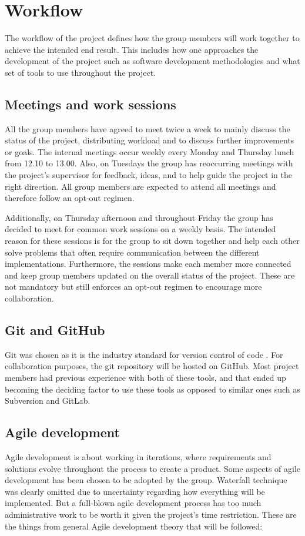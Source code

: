 \section{Workflow}

The workflow of the project defines how the group members will work together to achieve the intended end result.
This includes how one approaches the development of the project such as software development methodologies and what set of tools to use throughout the project.

\subsection{Meetings and work sessions} 
All the group members have agreed to meet twice a week to mainly discuss the status of the project, distributing workload and to discuss further improvements or goals.
The internal meetings occur weekly every Monday and Thursday lunch from 12.10 to 13.00.
Also, on Tuesdays the group has reoccurring meetings with the project's supervisor for feedback, ideas, and to help guide the project in the right direction.
All group members are expected to attend all meetings and therefore follow an opt-out regimen.

Additionally, on Thursday afternoon and throughout Friday the group has decided to meet for common work sessions on a weekly basis.
The intended reason for these sessions is for the group to sit down together and help each other solve problems that often require communication between the different implementations.
Furthermore, the sessions make each member more connected and keep group members updated on the overall status of the project.
These are not mandatory but still enforces an opt-out regimen to encourage more collaboration.

\subsection{Git and GitHub}
Git was chosen as it is the industry standard for version control of code \cite{git_industry_standard}.
For collaboration purposes, the git repository will be hosted on GitHub.
Most project members had previous experience with both of these tools, and that ended up becoming the deciding factor to use these tools as opposed to similar ones such as Subversion and GitLab.

\subsection{Agile development}
Agile development is about working in iterations, where requirements and solutions evolve throughout the process to create a product. 
Some aspects of agile development has been chosen to be adopted by the group. 
Waterfall technique was clearly omitted due to uncertainty regarding how everything will be implemented. 
But a full-blown agile development process has too much administrative work to be worth it given the project's time restriction.
These are the things from general Agile development theory that will be followed:

